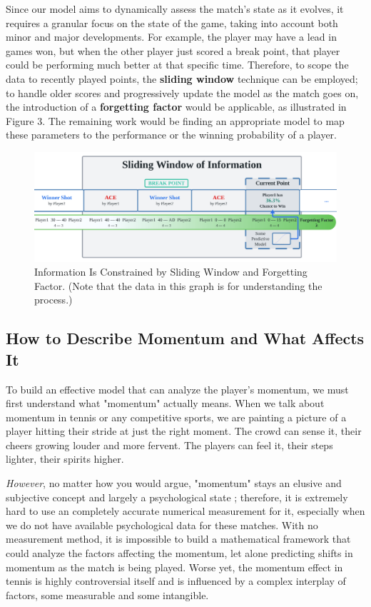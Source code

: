 \documentclass[12pt]{article}  %
\begin{document}
Since our model aims to dynamically assess the match's state as it evolves, it requires a granular focus on the state of the game, taking into account both minor and major developments. For example, the player may have a lead in games won, but when the other player just scored a break point, that player could be performing much better at that specific time. Therefore, to scope the data to recently played points, the \textbf{sliding window} technique can be employed; to handle older scores and progressively update the model as the match goes on, the introduction of a \textbf{forgetting factor} would be applicable, as illustrated in Figure 3. The remaining work would be finding an appropriate model to map these parameters to the performance or the winning probability of a player. 

\begin{figure}[htbp]  %
	\centering  %
	\includegraphics[width=.76\textwidth]{sliding-window.png} %
	\caption{\centering Information Is Constrained by Sliding Window and Forgetting Factor. (Note that the data in this graph is for understanding the process.)} %
\end{figure}

\subsection{How to Describe Momentum and What Affects It}
To build an effective model that can analyze the player's momentum, we must first understand what "momentum" actually means. When we talk about momentum in tennis or any competitive sports, we are painting a picture of a player hitting their stride at just the right moment. The crowd can sense it, their cheers growing louder and more fervent. The players can feel it, their steps lighter, their spirits higher. 

\textit{However}, no matter how you would argue, "momentum" stays an elusive and subjective concept and largely a psychological state \cite{-1}; therefore, it is extremely hard to use an completely accurate numerical measurement for it, especially when we do not have available psychological data for these matches. With no measurement method, it is impossible to build a mathematical framework that could analyze the factors affecting the momentum, let alone predicting shifts in momentum as the match is being played. Worse yet, the momentum effect in tennis is highly controversial itself and is influenced by a complex interplay of factors, some measurable and some intangible.
\end{document}
